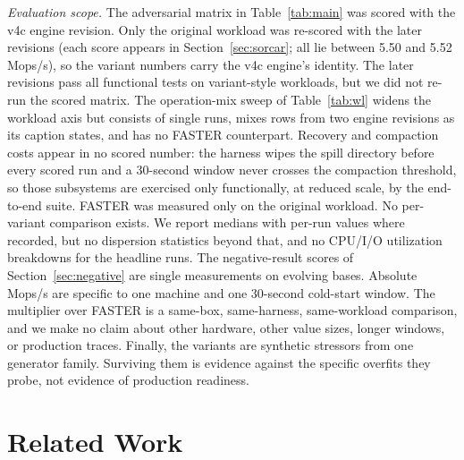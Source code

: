 \documentclass{article}
\newcommand{\HydraProd}{5.52}           %
\newcommand{\HydraAuditFixed}{5.50}     %
\begin{document}
\emph{Evaluation scope.} The adversarial matrix in Table~\ref{tab:main} was scored with the v4c engine revision. Only the original workload was re-scored with the later revisions (each score appears in Section~\ref{sec:sorcar}; all lie between \HydraAuditFixed{} and \HydraProd{} Mops/s), so the variant numbers carry the v4c engine's identity. The later revisions pass all functional tests on variant-style workloads, but we did not re-run the scored matrix. The operation-mix sweep of Table~\ref{tab:wl} widens the workload axis but consists of single runs, mixes rows from two engine revisions as its caption states, and has no FASTER counterpart. Recovery and compaction costs appear in no scored number: the harness wipes the spill directory before every scored run and a 30-second window never crosses the compaction threshold, so those subsystems are exercised only functionally, at reduced scale, by the end-to-end suite. FASTER was measured only on the original workload. No per-variant comparison exists. We report medians with per-run values where recorded, but no dispersion statistics beyond that, and no CPU/I/O utilization breakdowns for the headline runs. The negative-result scores of Section~\ref{sec:negative} are single measurements on evolving bases. Absolute Mops/s are specific to one machine and one 30-second cold-start window. The multiplier over FASTER is a same-box, same-harness, same-workload comparison, and we make no claim about other hardware, other value sizes, longer windows, or production traces. Finally, the variants are synthetic stressors from one generator family. Surviving them is evidence against the specific overfits they probe, not evidence of production readiness.

\section{Related Work}
\label{sec:related}
\end{document}
